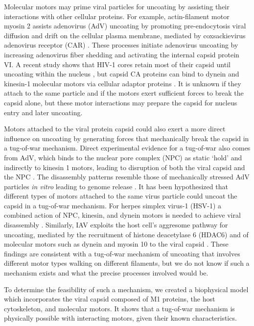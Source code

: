 Molecular motors may prime viral particles for uncoating by assisting their interactions with other cellular proteins. For example, actin-filament motor myosin 2 assists adenovirus (AdV) uncoating by promoting pre-endocytosis viral diffusion and drift on the cellular plasma membrane, mediated by coxsackievirus adenovirus receptor (CAR) \cite{burckhardt2011drifting}. These processes initiate adenovirus uncoating by increasing adenovirus fiber shedding and activating the internal capsid protein VI. A recent study shows that HIV-1 cores retain most of their capsid until uncoating within the nucleus \cite{li2021hiv}, but capsid CA proteins can bind to dynein and kinesin-1 molecular motors via cellular adaptor proteins \cite{carnes2018hiv, lukic2014hiv, malikov2017localized}. It is unknown if they attach to the same particle and if the motors exert sufficient forces \cite{malikov2017localized} to break the capsid alone, but these motor interactions may prepare the capsid for nucleus entry and later uncoating.

Motors attached to the viral protein capsid could also exert a more direct influence on uncoating by generating forces that mechanically break the capsid in a tug-of-war mechanism. Direct experimental evidence for a tug-of-war also comes from AdV, which binds to the nuclear pore complex (NPC) as static ‘hold’ and indirectly to kinesin 1 motors, leading to disruption of both the viral capsid and the NPC \cite{greber2019adenovirus, strunze2011kinesin}. The disassembly patterns resemble those of mechanically stressed AdV particles \textit{in vitro} leading to genome release \cite{ortega2015fluorescence, ortega2013monitoring}. It has been hypothesized that different types of motors attached to the same virus particle could uncoat the capsid in a tug-of-war mechanism. For herpes simplex virus-1 (HSV-1) a combined action of NPC, kinesin, and dynein motors is needed to achieve viral disassembly \cite{ravindran2016viruses, radtke2010plus}. Similarly, IAV exploits the host cell’s aggresome pathway for uncoating, mediated by the recruitment of histone deacetylase 6 (HDAC6) and of molecular motors such as dynein and myosin 10 to the viral capsid \cite{banerjee2014influenza}. These findings are consistent with a tug-of-war mechanism of uncoating that involves different motor types walking on different filaments, but we do not know if such a mechanism exists and what the precise processes involved would be.

To determine the feasibility of such a mechanism, we created a biophysical model which incorporates the viral capsid composed of M1 proteins, the host cytoskeleton, and molecular motors. It shows that a tug-of-war mechanism is physically possible with interacting motors, given their known characteristics.